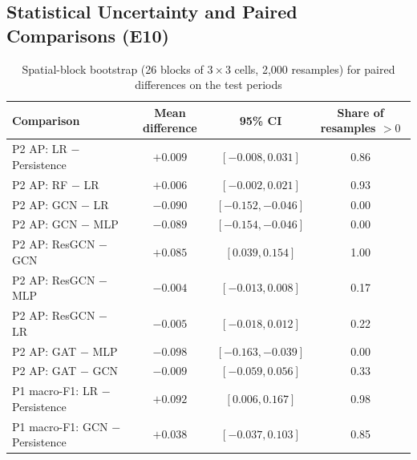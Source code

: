 \documentclass[11pt,a4paper]{report}
\begin{document}
\subsection{Statistical Uncertainty and Paired Comparisons (E10)}
\begin{table}[H]
\centering\small
\caption{Spatial-block bootstrap (26 blocks of $3\times3$ cells, 2,000 resamples) for paired differences on the test periods}
\label{tab:boot}
\begin{tabular}{@{}lccc@{}}
\toprule
Comparison & Mean difference & 95\% CI & Share of resamples $>0$\\
\midrule
P2 AP: LR $-$ Persistence & $+0.009$ & $[-0.008, 0.031]$ & 0.86\\
P2 AP: RF $-$ LR & $+0.006$ & $[-0.002, 0.021]$ & 0.93\\
P2 AP: GCN $-$ LR & $-0.090$ & $[-0.152, -0.046]$ & 0.00\\
P2 AP: GCN $-$ MLP & $-0.089$ & $[-0.154, -0.046]$ & 0.00\\
P2 AP: ResGCN $-$ GCN & $+0.085$ & $[0.039, 0.154]$ & 1.00\\
P2 AP: ResGCN $-$ MLP & $-0.004$ & $[-0.013, 0.008]$ & 0.17\\
P2 AP: ResGCN $-$ LR & $-0.005$ & $[-0.018, 0.012]$ & 0.22\\
P2 AP: GAT $-$ MLP & $-0.098$ & $[-0.163, -0.039]$ & 0.00\\
P2 AP: GAT $-$ GCN & $-0.009$ & $[-0.059, 0.056]$ & 0.33\\
P1 macro-F1: LR $-$ Persistence & $+0.092$ & $[0.006, 0.167]$ & 0.98\\
P1 macro-F1: GCN $-$ Persistence & $+0.038$ & $[-0.037, 0.103]$ & 0.85\\
\bottomrule
\end{tabular}
\end{table}
\end{document}
